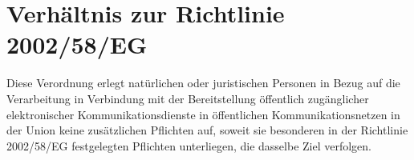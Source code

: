 \chapter{Verhältnis zur Richtlinie 2002/58/EG}
\label{ch:95}


Diese Verordnung erlegt natürlichen oder juristischen Personen in Bezug auf die Verarbeitung in Verbindung mit der
Bereitstellung öffentlich zugänglicher elektronischer Kommunikationsdienste in öffentlichen Kommunikationsnetzen in der
Union keine zusätzlichen Pflichten auf, soweit sie besonderen in der Richtlinie 2002/58/EG festgelegten
Pflichten unterliegen, die dasselbe Ziel verfolgen.


